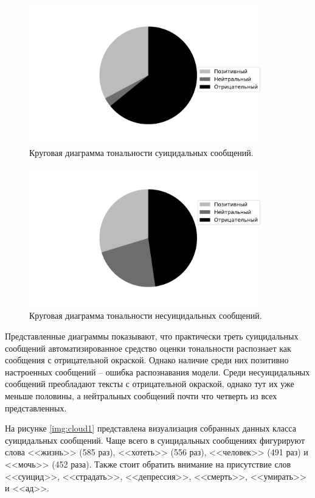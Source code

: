\begin{figure}[H]
	\centering
	\includegraphics[width=0.9\textwidth]{inc/plots/sentiments_suicidal_monochrome.pdf}
	\caption{ Круговая диаграмма тональности суицидальных сообщений. }
	\label{img:sentiments1}
\end{figure}

\begin{figure}[H]
	\centering
	\includegraphics[width=0.9\textwidth]{inc/plots/sentiments_non_suicidal_monochrome.pdf}
	\caption{ Круговая диаграмма тональности несуицидальных сообщений. }
	\label{img:sentiments2}
\end{figure}

Представленные диаграммы показывают, что практически треть суицидальных сообщений автоматизированное средство оценки тональности распознает как сообщения с отрицательной окраской. Однако наличие среди них позитивно настроенных сообщений -- ошибка распознавания модели. Среди несуицидальных сообщений преобладают тексты с отрицательной окраской, однако тут их уже меньше половины, а нейтральных сообщений почти что четверть из всех представленных. 

На рисунке \ref{img:cloud1} представлена визуализация собранных данных класса суицидальных сообщений. Чаще всего в суицидальных сообщениях фигурируют слова <<жизнь>> (585 раз), <<хотеть>> (556 раз), <<человек>> (491 раз) и <<мочь>> (452 раза). Также стоит обратить внимание на присутствие слов <<суицид>>, <<страдать>>, <<депрессия>>, <<смерть>>, <<умирать>> и <<ад>>.

